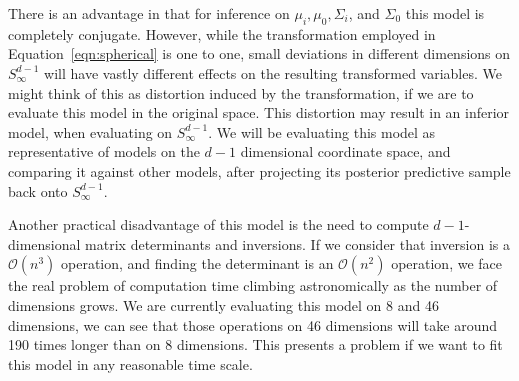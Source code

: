   There is an advantage in that for inference on $\mu_i, \mu_0, \Sigma_i$, and $\Sigma_0$ this model
  is completely conjugate.  However, while the transformation employed in Equation~\ref{eqn:spherical}
  is one to one, small deviations in different dimensions on $S_{\infty}^{d-1}$ will have vastly
  different effects on the resulting transformed variables.  We might think of this as distortion
  induced by the transformation, if we are to evaluate this model in the original space.  This
  distortion may result in an inferior model, when evaluating on $S_{\infty}^{d-1}$.  We will be
  evaluating this model as representative of models on the $d-1$ dimensional coordinate space, and
  comparing it against other models, after projecting its posterior predictive sample back onto
  $S_{\infty}^{d-1}$.

Another practical disadvantage of this model is the need to compute $d-1$-dimensional matrix
  determinants and inversions.  If we consider that inversion is a $\mathcal{O}(n^3)$ operation, and
  finding the determinant is an $\mathcal{O}(n^2)$ operation, we face the real problem of computation
  time climbing astronomically as the number of dimensions grows.  We are currently evaluating this
  model on 8 and 46 dimensions, we can see that those operations on 46 dimensions will take around
  190 times longer than on 8 dimensions.  This presents a problem if we want to fit this model in
  any reasonable time scale.

